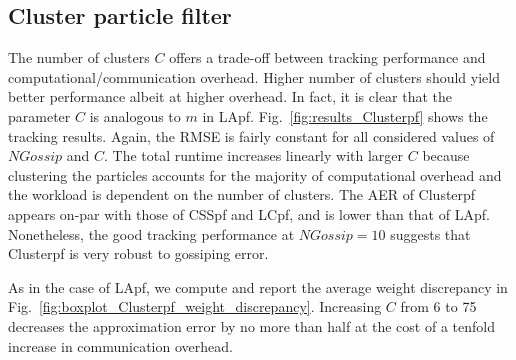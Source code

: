 \documentclass[10pt,letterpaper,final]{article}
\begin{document}
\subsection{Cluster particle filter}
The number of clusters $C$ offers a trade-off between tracking performance and computational/communication overhead. Higher number of clusters should yield better performance albeit at higher overhead. In fact, it is clear that the parameter $C$ is analogous to $m$ in LApf. Fig.~\ref{fig:results_Clusterpf} shows the tracking results. Again, the RMSE is fairly constant for all considered values of $NGossip$ and $C$. The total runtime increases linearly with larger $C$ because clustering the particles accounts for the majority of computational overhead and the workload is dependent on the number of clusters. The AER of Clusterpf appears on-par with those of CSSpf and LCpf, and is lower than that of LApf. Nonetheless, the good tracking performance at $NGossip=10$ suggests that Clusterpf is very robust to gossiping error. 

As in the case of LApf, we compute and report the average weight discrepancy in Fig.~\ref{fig:boxplot_Clusterpf_weight_discrepancy}. Increasing $C$ from 6 to 75 decreases the approximation error by no more than half at the cost of a tenfold increase in communication overhead. 
\end{document}
